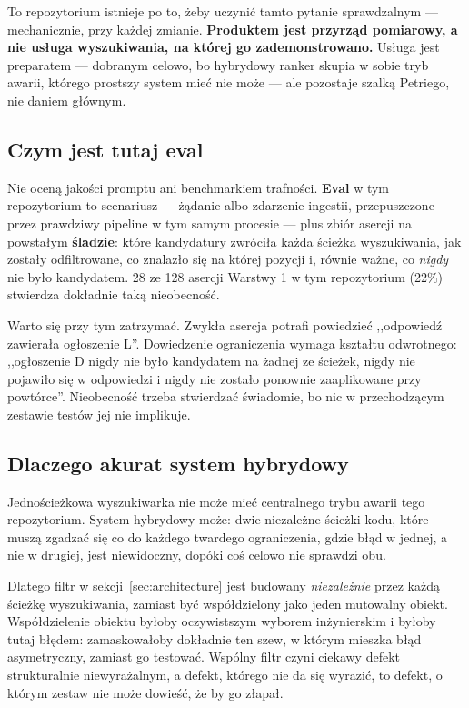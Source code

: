 \documentclass[11pt,a4paper]{article}
\newcommand{\finding}[1]{{\color{primaryblue}\textbf{#1}}}
\begin{document}
To repozytorium istnieje po to, żeby uczynić tamto pytanie sprawdzalnym ---
mechanicznie, przy każdej zmianie. \finding{Produktem jest przyrząd pomiarowy,
a nie usługa wyszukiwania, na której go zademonstrowano.} Usługa jest
preparatem --- dobranym celowo, bo hybrydowy ranker skupia w sobie tryb awarii,
którego prostszy system mieć nie może --- ale pozostaje szalką Petriego, nie
daniem głównym.

\subsection{Czym jest tutaj eval}

Nie oceną jakości promptu ani benchmarkiem trafności. \textbf{Eval} w tym
repozytorium to scenariusz --- żądanie albo zdarzenie ingestii, przepuszczone
przez prawdziwy pipeline w tym samym procesie --- plus zbiór asercji na
powstałym \textbf{śladzie}: które kandydatury zwróciła każda ścieżka
wyszukiwania, jak zostały odfiltrowane, co znalazło się na której pozycji i,
równie ważne, co \emph{nigdy} nie było kandydatem. 28 ze 128 asercji Warstwy 1
w tym repozytorium (22\%) stwierdza dokładnie taką nieobecność.

Warto się przy tym zatrzymać. Zwykła asercja potrafi powiedzieć ,,odpowiedź
zawierała ogłoszenie L''. Dowiedzenie ograniczenia wymaga kształtu odwrotnego:
,,ogłoszenie D nigdy nie było kandydatem na żadnej ze ścieżek, nigdy nie
pojawiło się w odpowiedzi i nigdy nie zostało ponownie zaaplikowane przy
powtórce''. Nieobecność trzeba stwierdzać świadomie, bo nic w przechodzącym
zestawie testów jej nie implikuje.

\subsection{Dlaczego akurat system hybrydowy}

Jednościeżkowa wyszukiwarka nie może mieć centralnego trybu awarii tego
repozytorium. System hybrydowy może: dwie niezależne ścieżki kodu, które muszą
zgadzać się co do każdego twardego ograniczenia, gdzie błąd w jednej, a nie w
drugiej, jest niewidoczny, dopóki coś celowo nie sprawdzi obu.

Dlatego filtr w sekcji~\ref{sec:architecture} jest budowany \emph{niezależnie}
przez każdą ścieżkę wyszukiwania, zamiast być współdzielony jako jeden
mutowalny obiekt. Współdzielenie obiektu byłoby oczywistszym wyborem
inżynierskim i byłoby tutaj błędem: zamaskowałoby dokładnie ten szew, w którym
mieszka błąd asymetryczny, zamiast go testować. Wspólny filtr czyni ciekawy
defekt strukturalnie niewyrażalnym, a defekt, którego nie da się wyrazić, to
defekt, o którym zestaw nie może dowieść, że by go złapał.
\end{document}
